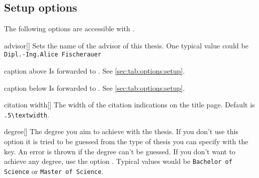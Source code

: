 \subsection{Setup options}\label{sec:thesis:setup}%
The following options are accessible with .
\begin{describeopt}{advisor}[]
  Sets the name of the advisor of this thesis. One typical value could be
  \texttt{Dipl.-Ing.\@ Alice Fischerauer}
\end{describeopt}
\begin{describeopt}{caption above}
  Is forwarded to . See \autoref{sec:tab:options:setup}.
\end{describeopt}
\begin{describeopt}{caption below}
  Is forwarded to . See \autoref{sec:tab:options:setup}.
\end{describeopt}
\begin{describeopt}{citation width}[]
  The width of the citation indications on the title page. Default is
  \verb|.5\textwidth|.
\end{describeopt}
\begin{describeopt}{degree}[]
  The degree you aim to achieve with the thesis. If you don't use this option it
  is tried to be guessed from the type of thesis you can specify with the
   key. An error is thrown if the degree can't be guessed. If you
  don't want to achieve any degree, use the option . Typical
  values would be \verb|Bachelor of Science| or \verb|Master of Science|.
\end{describeopt}

